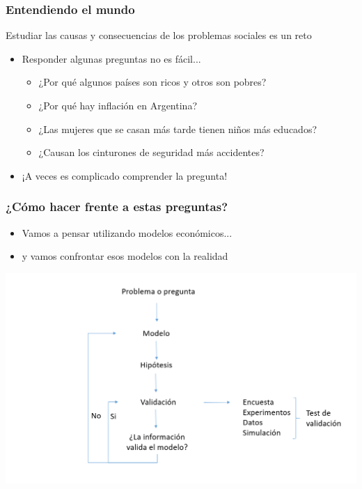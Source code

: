 \documentclass{beamer}
\begin{document}
\begin{frame}
\frametitle{Entendiendo el mundo}
Estudiar las causas y consecuencias de los problemas sociales es un reto 
\begin{itemize}
    \item Responder algunas preguntas no es fácil...
    \begin{itemize}
        \item ¿Por qué algunos países son ricos y otros son pobres?
        \item ¿Por qué hay inflación en Argentina?
        \item ¿Las mujeres que se casan más tarde tienen niños más educados?
        \item ¿Causan los cinturones de seguridad más accidentes?
        \end{itemize}
    \item ¡A veces es complicado comprender la pregunta!
\end{itemize}
\end{frame}

\begin{frame}
\frametitle{¿Cómo hacer frente a estas preguntas?}
    \begin{itemize}
            \item Vamos a pensar utilizando modelos económicos... \vspace{2mm}
            \item y vamos confrontar esos modelos con la realidad
    \end{itemize} \vspace{2mm}
\begin{center}
    \includegraphics[scale=0.4]{../C1.9.png}
\end{center}
\end{frame}
\end{document}

